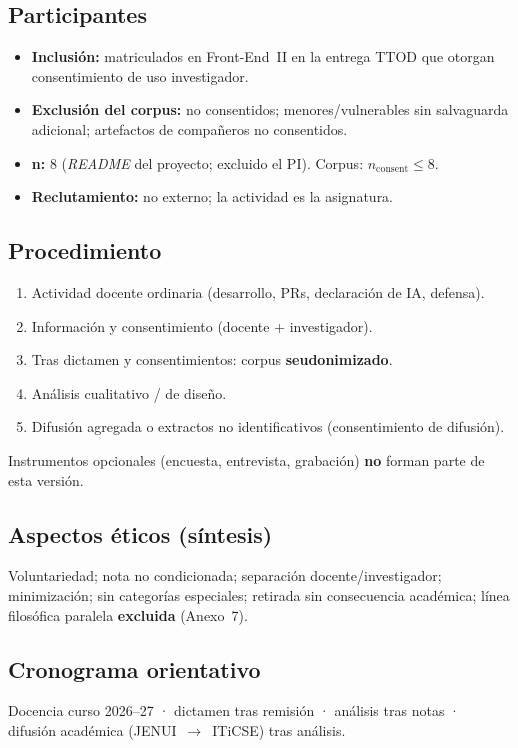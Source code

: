 \documentclass[11pt,a4paper]{scrartcl}
\begin{document}
\subsection*{Participantes}
\begin{itemize}
  \item \textbf{Inclusión:} matriculados en Front-End~II en la entrega TTOD que
        otorgan consentimiento de uso investigador.
  \item \textbf{Exclusión del corpus:} no consentidos; menores/vulnerables sin
        salvaguarda adicional; artefactos de compañeros no consentidos.
  \item \textbf{n:} 8 (\emph{README} del proyecto; excluido el PI). Corpus: $n_{\mathrm{consent}}\leq 8$.
  \item \textbf{Reclutamiento:} no externo; la actividad es la asignatura.
\end{itemize}

\subsection*{Procedimiento}
\begin{enumerate}
  \item Actividad docente ordinaria (desarrollo, PRs, declaración de IA, defensa).
  \item Información y consentimiento (docente + investigador).
  \item Tras dictamen y consentimientos: corpus \textbf{seudonimizado}.
  \item Análisis cualitativo / de diseño.
  \item Difusión agregada o extractos no identificativos (consentimiento de difusión).
\end{enumerate}
Instrumentos opcionales (encuesta, entrevista, grabación) \textbf{no} forman parte
de esta versión.

\subsection*{Aspectos éticos (síntesis)}
Voluntariedad; nota no condicionada; separación docente/investigador; minimización;
sin categorías especiales; retirada sin consecuencia académica; línea filosófica
paralela \textbf{excluida} (Anexo~7).

\subsection*{Cronograma orientativo}
Docencia curso 2026--27 · dictamen tras remisión · análisis tras notas · difusión
académica (JENUI~$\rightarrow$~ITiCSE) tras análisis.
\end{document}
